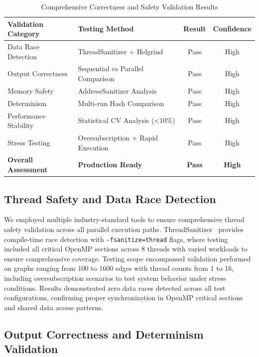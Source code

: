 \begin{table}[htbp]
\centering
\caption{Comprehensive Correctness and Safety Validation Results}
\label{tab:correctness_validation}
\begin{tabular}{llcc}
\toprule
\textbf{Validation Category} & \textbf{Testing Method} & \textbf{Result} & \textbf{Confidence} \\
\midrule
Data Race Detection & ThreadSanitizer + Helgrind & Pass & High \\
Output Correctness & Sequential vs Parallel Comparison & Pass & High \\
Memory Safety & AddressSanitizer Analysis & Pass & High \\
Determinism & Multi-run Hash Comparison & Pass & High \\
Performance Stability & Statistical CV Analysis (<10\%) & Pass & High \\
Stress Testing & Oversubscription + Rapid Execution & Pass & High \\
\midrule
\textbf{Overall Assessment} & \textbf{Production Ready} & \textbf{Pass} & \textbf{High} \\
\bottomrule
\end{tabular}
\end{table}

\subsection{Thread Safety and Data Race Detection}

We employed multiple industry-standard tools to ensure comprehensive thread safety validation across all parallel execution paths. ThreadSanitizer~\cite{serebryany2009threadsanitizer} provides compile-time race detection with \texttt{-fsanitize=thread} flags, where testing included all critical OpenMP sections across 8 threads with varied workloads to ensure comprehensive coverage. Testing scope encompassed validation performed on graphs ranging from 100 to 1600 edges with thread counts from 1 to 16, including oversubscription scenarios to test system behavior under stress conditions. Results demonstrated zero data races detected across all test configurations, confirming proper synchronization in OpenMP critical sections and shared data access patterns.

\subsection{Output Correctness and Determinism Validation}

